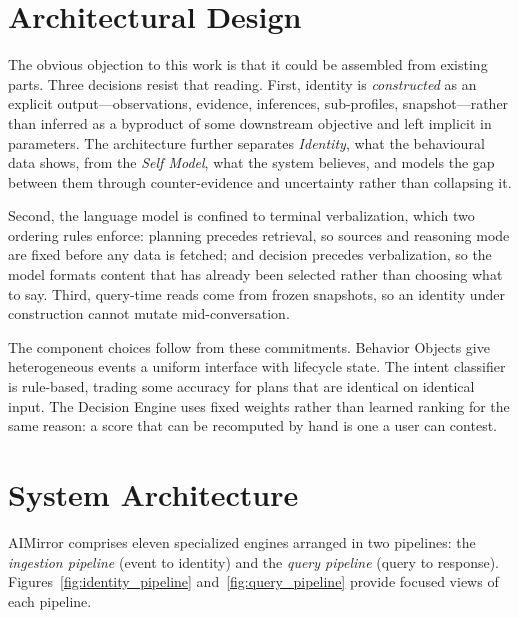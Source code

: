 \documentclass[conference]{IEEEtran}
\begin{document}
\section{Architectural Design}
\label{sec:design}

The obvious objection to this work is that it could be assembled from existing parts. Three decisions resist that reading. First, identity is \emph{constructed} as an explicit output---observations, evidence, inferences, sub-profiles, snapshot---rather than inferred as a byproduct of some downstream objective and left implicit in parameters. The architecture further separates \emph{Identity}, what the behavioural data shows, from the \emph{Self Model}, what the system believes, and models the gap between them through counter-evidence and uncertainty rather than collapsing it.

Second, the language model is confined to terminal verbalization, which two ordering rules enforce: planning precedes retrieval, so sources and reasoning mode are fixed before any data is fetched; and decision precedes verbalization, so the model formats content that has already been selected rather than choosing what to say. Third, query-time reads come from frozen snapshots, so an identity under construction cannot mutate mid-conversation.

The component choices follow from these commitments. Behavior Objects give heterogeneous events a uniform interface with lifecycle state. The intent classifier is rule-based, trading some accuracy for plans that are identical on identical input. The Decision Engine uses fixed weights rather than learned ranking for the same reason: a score that can be recomputed by hand is one a user can contest.

\section{System Architecture}
\label{sec:architecture}

AIMirror comprises eleven specialized engines arranged in two pipelines: the \emph{ingestion pipeline} (event to identity) and the \emph{query pipeline} (query to response). Figures~\ref{fig:identity_pipeline} and~\ref{fig:query_pipeline} provide focused views of each pipeline.
\end{document}

